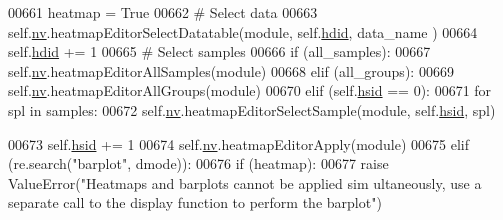 \begin{DoxyCode}
00661                 heatmap = \textcolor{keyword}{True}
00662                 \textcolor{comment}{# Select data}
00663                 self.\hyperlink{classnavicom_1_1navicom_1_1NaviCom_af740fe52f9f3cfc076ae88ca696bd05e}{nv}.heatmapEditorSelectDatatable(module, self.\hyperlink{classnavicom_1_1navicom_1_1NaviCom_a35fe0d421abe7e1b08fc92ca58b689db}{hdid}, data\_name
      )
00664                 self.\hyperlink{classnavicom_1_1navicom_1_1NaviCom_a35fe0d421abe7e1b08fc92ca58b689db}{hdid} += 1
00665                 \textcolor{comment}{# Select samples}
00666                 \textcolor{keywordflow}{if} (all\_samples):
00667                     self.\hyperlink{classnavicom_1_1navicom_1_1NaviCom_af740fe52f9f3cfc076ae88ca696bd05e}{nv}.heatmapEditorAllSamples(module)
00668                 \textcolor{keywordflow}{elif} (all\_groups):
00669                     self.\hyperlink{classnavicom_1_1navicom_1_1NaviCom_af740fe52f9f3cfc076ae88ca696bd05e}{nv}.heatmapEditorAllGroups(module)
00670                 \textcolor{keywordflow}{elif} (self.\hyperlink{classnavicom_1_1navicom_1_1NaviCom_ac8b826435d1ae69420151967b3a872eb}{hsid} == 0):
00671                     \textcolor{keywordflow}{for} spl \textcolor{keywordflow}{in} samples:
00672                         self.\hyperlink{classnavicom_1_1navicom_1_1NaviCom_af740fe52f9f3cfc076ae88ca696bd05e}{nv}.heatmapEditorSelectSample(module, self.\hyperlink{classnavicom_1_1navicom_1_1NaviCom_ac8b826435d1ae69420151967b3a872eb}{hsid}, spl)
      
00673                         self.\hyperlink{classnavicom_1_1navicom_1_1NaviCom_ac8b826435d1ae69420151967b3a872eb}{hsid} += 1
00674                     self.\hyperlink{classnavicom_1_1navicom_1_1NaviCom_af740fe52f9f3cfc076ae88ca696bd05e}{nv}.heatmapEditorApply(module)
00675             \textcolor{keywordflow}{elif} (re.search(\textcolor{stringliteral}{"barplot"}, dmode)):
00676                 \textcolor{keywordflow}{if} (heatmap):
00677                     \textcolor{keywordflow}{raise} ValueError(\textcolor{stringliteral}{"Heatmaps and barplots cannot be applied sim
      ultaneously, use a separate call to the display function to perform the barplot"})
      

\end{DoxyCode}
